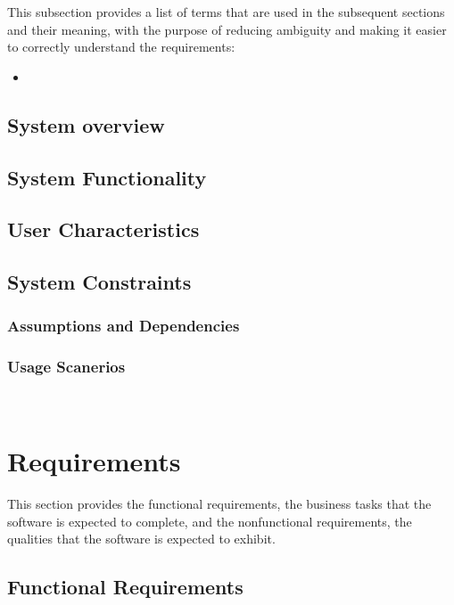 \documentclass[12pt]{article}
\begin{document}
This subsection provides a list of terms that are used in the subsequent
sections and their meaning, with the purpose of reducing ambiguity and making it
easier to correctly understand the requirements:

\begin{itemize}
\item 
\end{itemize}

\subsection{System overview}

\subsection{System Functionality}

\subsection{User Characteristics} \label{SecUserCharacteristics}

\subsection{System Constraints}

\subsubsection{Assumptions and Dependencies} \label{sec_assumpt}

\subsubsection{Usage Scanerios}


~\newpage

\section{Requirements}

This section provides the functional requirements, the business tasks that the
software is expected to complete, and the nonfunctional requirements, the
qualities that the software is expected to exhibit.

\subsection{Functional Requirements}
\end{document}
